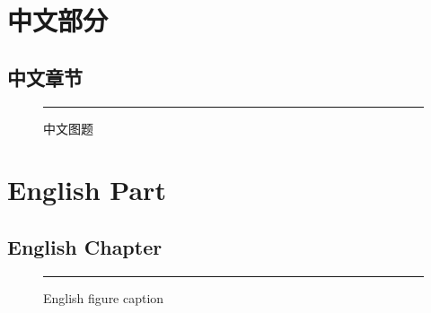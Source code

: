 \documentclass[fontset=fandol]{ctexbook}
\begin{document}
\part{中文部分}
\chapter{中文章节}
\begin{figure}[h]
  \centering\rule{20mm}{10mm}
  \caption{中文图题}
\end{figure}

\part{English Part}
\chapter{English Chapter}
\begin{figure}[h]
  \centering\rule{20mm}{10mm}
  \caption{English figure caption}
\end{figure}
\end{document}
